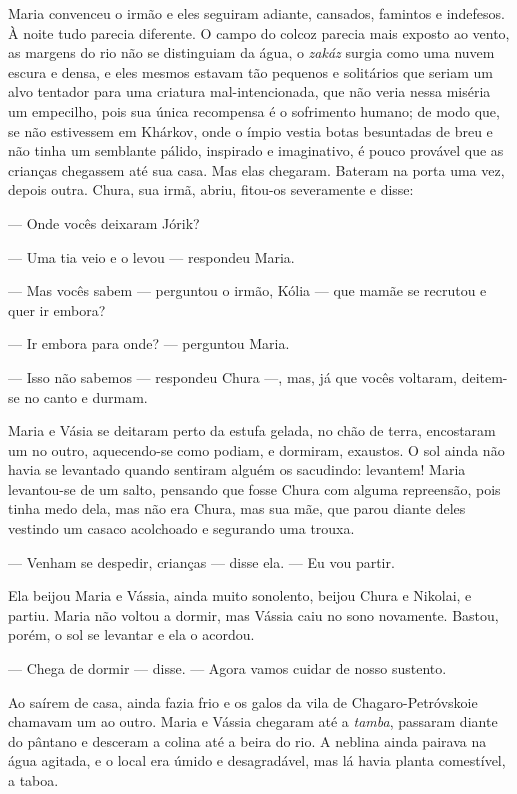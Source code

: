 Maria convenceu o irmão e eles seguiram adiante, cansados, famintos e
indefesos. À noite tudo parecia diferente. O campo do colcoz parecia
mais exposto ao vento, as margens do rio não se distinguiam da água, o
\emph{zakáz} surgia como uma nuvem escura e densa, e eles mesmos estavam
tão pequenos e solitários que seriam um alvo tentador para uma criatura
mal-intencionada, que não veria nessa miséria um empecilho, pois sua
única recompensa é o sofrimento humano; de modo que, se não estivessem
em Khárkov, onde o ímpio vestia botas besuntadas de breu e não tinha um
semblante pálido, inspirado e imaginativo, é pouco provável que as
crianças chegassem até sua casa. Mas elas chegaram. Bateram na porta uma
vez, depois outra. Chura, sua irmã, abriu, fitou-os severamente e disse:

--- Onde vocês deixaram Jórik?

--- Uma tia veio e o levou --- respondeu Maria.

--- Mas vocês sabem --- perguntou o irmão, Kólia --- que mamãe se
recrutou e quer ir embora?

--- Ir embora para onde? --- perguntou Maria.

--- Isso não sabemos --- respondeu Chura ---, mas, já que vocês
voltaram, deitem-se no canto e durmam.

Maria e Vásia se deitaram perto da estufa gelada, no chão de terra,
encostaram um no outro, aquecendo-se como podiam, e dormiram, exaustos.
O sol ainda não havia se levantado quando sentiram alguém os sacudindo:
levantem! Maria levantou-se de um salto, pensando que fosse Chura com
alguma repreensão, pois tinha medo dela, mas não era Chura, mas sua mãe,
que parou diante deles vestindo um casaco acolchoado e segurando uma
trouxa.

--- Venham se despedir, crianças --- disse ela. --- Eu vou partir.

Ela beijou Maria e Vássia, ainda muito sonolento, beijou Chura e
Nikolai, e partiu. Maria não voltou a dormir, mas Vássia caiu no sono
novamente. Bastou, porém, o sol se levantar e ela o acordou.

--- Chega de dormir --- disse. --- Agora vamos cuidar de nosso sustento.

Ao saírem de casa, ainda fazia frio e os galos da vila de
Chagaro-Petróvskoie chamavam um ao outro. Maria e Vássia chegaram até a
\emph{tamba}, passaram diante do pântano e desceram a colina até a beira
do rio. A neblina ainda pairava na água agitada, e o local era úmido e
desagradável, mas lá havia planta comestível, a taboa.

